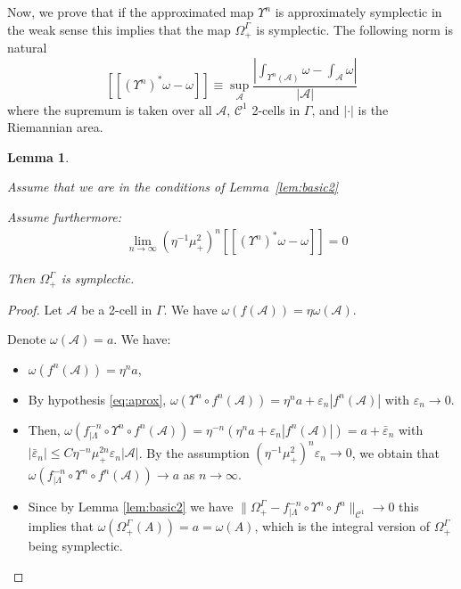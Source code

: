 \documentclass[11pt]{amsart}
\newtheorem{lem}[thm]{Lemma}
\theoremstyle{definition}
\theoremstyle{remark}
\numberwithin{equation}{section}
\newcommand{\eps}{\varepsilon}
\newcommand{\A}{\mathcal{A}}
\newcommand{\C}{\mathcal{C}}
\begin{document}
Now, we prove that if the approximated map $\Upsilon^n$ is approximately symplectic
in the weak sense this implies that the map $\Omega_+^\Gamma$ is symplectic.
The following norm is natural
\[
  [[ (\Upsilon^n)^* \omega - \omega ]] \equiv
  \sup_{\A} \frac{| \int_{\Upsilon^n (\A)} \omega - \int_\A \omega|}{|\A|}
  \]
where the supremum is taken over all $\A$, $\C^1$ 2-cells in $\Gamma$,
and $|\cdot|$ is the Riemannian area.

\begin{lem}
  \label{lem:basic3}

  Assume that we are in the conditions of Lemma~\ref{lem:basic2}

  Assume furthermore:
  \begin{equation}\label{eq:aprox}
  \begin{split}
    &\lim_{n \to \infty}
   (\eta ^{-1} \mu_+ ^{2})^n [[( \Upsilon^n)^* \omega - \omega ]] = 0
       \end{split}
  \end{equation}


Then
$\Omega_+^\Gamma$ is symplectic.
\end{lem}
\begin{proof}
Let $\A$ be  a 2-cell in $ \Gamma$.
We have  $\omega( f(\A ) )= \eta \omega(\A)$.

Denote  $\omega(\A) = a$. We have:
  \begin{itemize}
  \item
   $\omega(f^n(\A)) =  \eta^n a$,
  \item
  By hypothesis \ref{eq:aprox},
  $\omega(\Upsilon^n\circ f^n(\A)) = \eta^n a +  \eps_n|f^n(\A)|$
  with $\eps_n \rightarrow 0$.
  \item
Then,
  $\omega( f_{\mid\Lambda}^{-n} \circ
\Upsilon^n\circ f^n(\A)) =\eta^{-n} ( \eta^n a +  \eps_n |f^n(\A)|)
= a +\bar \eps_n
$
with $|\bar \eps_n| \le C  \eta ^{-n} \mu_+ ^{2n}\eps_n  |\A|$.
By the assumption $ (\eta ^{-1} \mu_+ ^{2})^n \eps_n\to 0$,  we obtain that $\omega( f_{\mid\Lambda}^{-n}\circ \Upsilon^n\circ f^n(\A)) \to a$  as $n\to\infty$.

\item
Since by Lemma \ref{lem:basic2} we have $\| \Omega_+^\Gamma - f_{\mid\Lambda}^{-n}\circ\Upsilon^n  \circ f^n \|_{\C^1} \to 0$ this implies that $\omega(\Omega_+^\Gamma(A))=a=\omega(A)$, which is the integral version of $\Omega_+^\Gamma$ being symplectic.
\end{itemize}
\end{proof}
\end{document}
